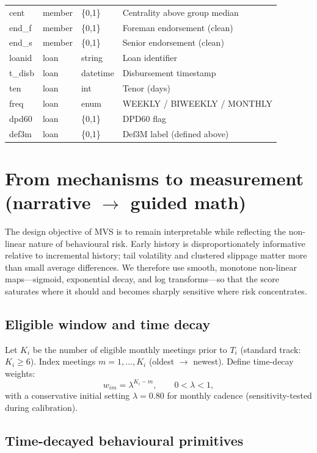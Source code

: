 \documentclass[11t]{article}
\begin{document}
\begin{longtable}{p{}p{}p{}p{}}
cent & member & \{0,1\} & Centrality above group median \\
end\_f & member & \{0,1\} & Foreman endorsement (clean) \\
end\_s & member & \{0,1\} & Senior endorsement (clean) \\
loanid & loan & string & Loan identifier \\
t\_disb & loan & datetime & Disbursement timestamp \\
ten & loan & int & Tenor (days) \\
freq & loan & enum & WEEKLY / BIWEEKLY / MONTHLY \\
dpd60 & loan & \{0,1\} & DPD60 flag \\
def3m & loan & \{0,1\} & $\text{Def3M}$ label (defined above) \\
\bottomrule
\end{longtable}

\section{From mechanisms to measurement (narrative \texorpdfstring{$\rightarrow$}{->} guided math)}

The design objective of MVS is to remain interpretable while reflecting the non-linear nature of behavioural risk. Early history is disproportionately informative relative to incremental history; 
tail volatility and clustered slippage matter more than small average differences. We therefore use smooth, monotone non-linear maps—sigmoid, exponential decay, and log transforms—so that the score saturates where it should and becomes sharply sensitive where risk concentrates.

\subsection{Eligible window and time decay}

Let $K_i$ be the number of eligible monthly meetings prior to $T_i$ (standard track: $K_i \ge 6$). Index meetings $m=1,\dots,K_i$ (oldest $\rightarrow$ newest). Define time-decay weights:
\begin{equation}
w_{im}=\lambda^{K_i-m}, \qquad 0<\lambda<1,
\end{equation}
with a conservative initial setting $\lambda=0.80$ for monthly cadence (sensitivity-tested during calibration).

\subsection{Time-decayed behavioural primitives}
\end{document}
